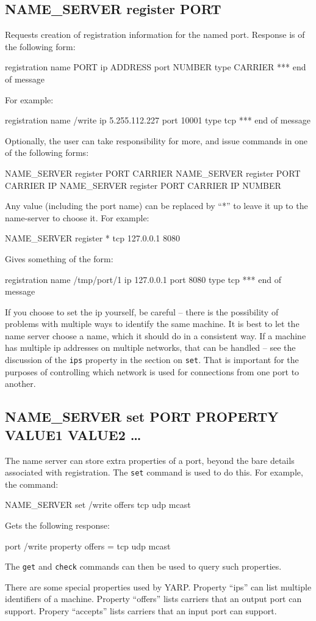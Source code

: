 \documentclass[a4]{article}
\newenvironment{codecase}[1]{\subsection{#1}}{}
\begin{document}
\begin{codecase}{NAME\_SERVER register PORT}

Requests creation of registration information for the named port.  
Response is of the following form:
\begin{code}
registration name PORT ip ADDRESS port NUMBER type CARRIER
*** end of message
\end{code}
For example:
\begin{code}
registration name /write ip 5.255.112.227 port 10001 type tcp
*** end of message
\end{code}
%
Optionally, the user can take responsibility for more, and 
issue commands in one of the following forms:
\begin{code}
NAME_SERVER register PORT CARRIER
NAME_SERVER register PORT CARRIER IP
NAME_SERVER register PORT CARRIER IP NUMBER
\end{code}
Any value (including the port name) can be replaced by ``*'' to leave it 
up to the name-server to choose it.  For example:
\begin{code}
NAME_SERVER register * tcp 127.0.0.1 8080
\end{code}
Gives something of the form:
\begin{code}
registration name /tmp/port/1 ip 127.0.0.1 port 8080 type tcp
*** end of message
\end{code}
If you choose to set the ip yourself, be careful -- there is the 
possibility of problems with multiple ways to identify the same
machine.  It is best to let the name server choose a name,
which it should do in a consistent way.  If a machine has
multiple ip addresses on multiple networks, that can be 
handled -- see the 
discussion of the {\tt ips} property in the section on {\tt set}.
That is important for the purposes of controlling which 
network is used for connections from one port to another.


\end{codecase}

\begin{codecase}{NAME\_SERVER set PORT PROPERTY VALUE1 VALUE2 \ldots}

The name server can store extra properties of a port, beyond the
bare details associated with registration.  The {\tt set} command
is used to do this.  For example, the command:
\begin{code}
NAME_SERVER set /write offers tcp udp mcast
\end{code}
Gets the following response:
\begin{code}
port /write property offers = tcp udp mcast
\end{code}
The {\tt get} and {\tt check} commands can then be used to query
such properties.

There are some special properties used by YARP.  Property ``ips''
can list multiple identifiers of a machine.  Property ``offers''
lists carriers that an output port can support.  Propery ``accepts''
lists carriers that an input port can support.

\end{codecase}
\end{document}
